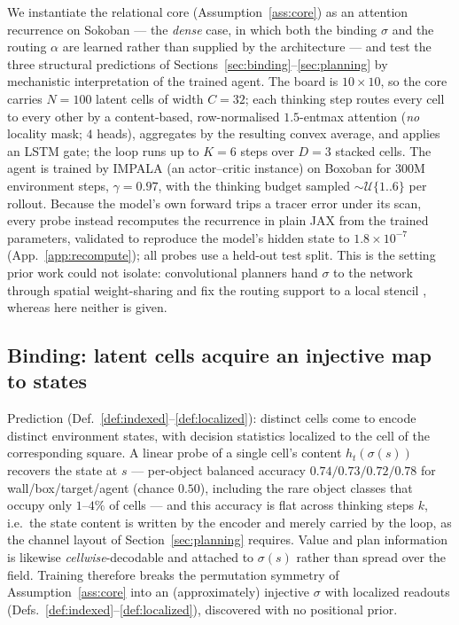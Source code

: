 \documentclass{article} %
\theoremstyle{plain}
\theoremstyle{definition}
\begin{document}
We instantiate the relational core (Assumption~\ref{ass:core}) as an attention
recurrence on Sokoban --- the \emph{dense} case, in which both the binding
$\sigma$ and the routing $\alpha$ are learned rather than supplied by the
architecture --- and test the three structural predictions of
Sections~\ref{sec:binding}--\ref{sec:planning} by mechanistic interpretation of
the trained agent. The board is $10\times10$, so the core carries $N=100$ latent
cells of width $C=32$; each thinking step routes every cell to every other by a
content-based, row-normalised $1.5$-entmax attention (\emph{no} locality mask;
$4$ heads), aggregates by the resulting convex average, and applies an LSTM
gate; the loop runs up to $K=6$ steps over $D=3$ stacked cells. The agent is
trained by IMPALA (an actor--critic instance) on Boxoban for $300\mathrm{M}$
environment steps, $\gamma=0.97$, with the thinking budget sampled
$\sim\mathcal U\{1..6\}$ per rollout. Because the model's own forward trips a
tracer error under its scan, every probe instead recomputes the recurrence in
plain JAX from the trained parameters, validated to reproduce the model's hidden
state to $1.8\times10^{-7}$ (App.~\ref{app:recompute}); all probes use a held-out
test split. This is the setting prior work could not isolate: convolutional
planners hand $\sigma$ to the network through spatial weight-sharing and fix the
routing support to a local stencil \citep{guez2019investigation,
bush2025interpreting, taufeeque2024planning}, whereas here neither is given.

\subsection{Binding: latent cells acquire an injective map to states}
\label{sec:emp-binding}

Prediction (Def.~\ref{def:indexed}--\ref{def:localized}): distinct cells come to
encode distinct environment states, with decision statistics localized to the
cell of the corresponding square. A linear probe of a single cell's content
$h_t(\sigma(s))$ recovers the state at $s$ --- per-object balanced accuracy
$0.74/0.73/0.72/0.78$ for wall/box/target/agent (chance $0.50$), including the
rare object classes that occupy only $1$--$4\%$ of cells --- and this accuracy is
flat across thinking steps $k$, i.e.\ the state content is written by the encoder
and merely carried by the loop, as the channel layout of
Section~\ref{sec:planning} requires. Value and plan information is likewise
\emph{cellwise}-decodable and attached to $\sigma(s)$ rather than spread over the
field. Training therefore breaks the permutation symmetry of
Assumption~\ref{ass:core} into an (approximately) injective $\sigma$ with
localized readouts (Defs.~\ref{def:indexed}--\ref{def:localized}), discovered
with no positional prior.
\end{document}
